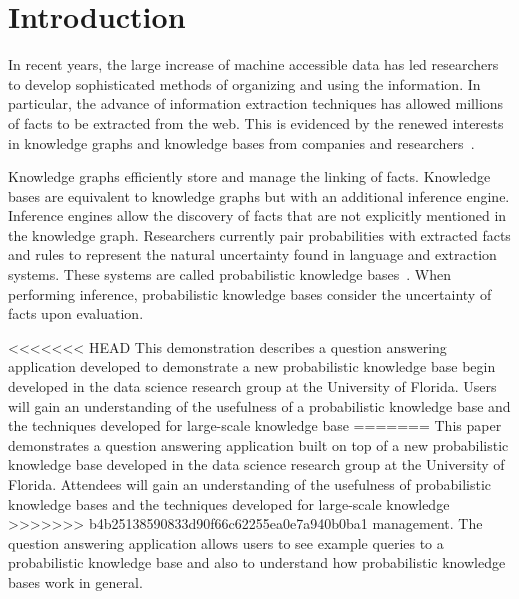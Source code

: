 

\section{Introduction}


In recent years, the large increase of machine accessible data has led researchers
to develop sophisticated methods of organizing and using the information.
In particular, the advance of information extraction techniques has allowed
millions of facts to be extracted from the web.
This is evidenced by the renewed interests in knowledge graphs and knowledge bases
from companies and
researchers~\cite{bellare2013woo,chang2014typed,dong2014knowledge,niu2012deepdive}.

Knowledge graphs efficiently store and manage the linking of facts.
Knowledge bases are equivalent to knowledge graphs but with an additional
inference engine. 
Inference engines allow the discovery of facts that are not explicitly
mentioned in the knowledge graph.
Researchers currently pair probabilities with extracted facts and rules to
represent the natural uncertainty found in language and extraction systems.
These systems are called probabilistic knowledge bases~\cite{chen2014knowledge}.
When performing inference, probabilistic knowledge bases consider the uncertainty
of facts upon evaluation.

<<<<<<< HEAD
This demonstration describes a question answering application developed to demonstrate
a new probabilistic knowledge base begin developed in the data science research group at the University of Florida.
Users will gain an understanding of the usefulness of a probabilistic
knowledge base and the techniques developed for large-scale knowledge base
=======
This paper demonstrates a question answering application built on top of
a new probabilistic knowledge base developed in the data science research group at the University of Florida.
Attendees will gain an understanding of the usefulness of probabilistic
knowledge bases and the techniques developed for large-scale knowledge
>>>>>>> b4b25138590833d90f66c62255ea0e7a940b0ba1
management.
The question answering application allows users to see example queries to a
probabilistic knowledge base and also to understand how probabilistic knowledge bases work in general.

